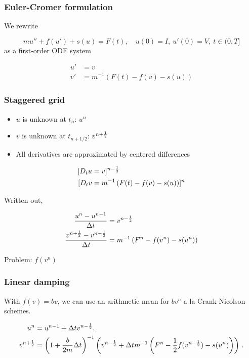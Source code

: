 \documentclass{beamer}
\begin{document}
\begin{frame}
\frametitle{Euler-Cromer formulation}

We rewrite

\[
mu'' + f(u') + s(u) = F(t),\quad u(0)=I,\ u'(0)=V,\ t\in (0,T]
\]
as a first-order ODE system

\begin{align*}
u' &= v
\\ 
v' &= m^{-1}\left(F(t) - f(v) - s(u)\right)
\end{align*}
\end{frame}

\begin{frame}
\frametitle{Staggered grid}

\begin{itemize}
 \item $u$ is unknown at $t_n$: $u^n$

 \item $v$ is unknown at $t_{n+1/2}$: $v^{n+\half}$

 \item All derivatives are approximated by centered differences
\end{itemize}

\noindent
\begin{align*}
\lbrack D_t u &= v\rbrack^{n-\half}
\\ 
\lbrack D_tv &= m^{-1}\left(F(t) - f(v) - s(u)\right)\rbrack^n
\end{align*}

Written out,

\begin{align*}
\frac{u^n - u^{n-1}}{\Delta t} &= v^{n-\half}\\ 
\frac{v^{n+\half} - v^{n-\half}}{\Delta t}
&= m^{-1}\left(F^n - f(v^n) - s(u^n)\right)
\end{align*}

Problem: $f(v^n)$
\end{frame}

\begin{frame}
\frametitle{Linear damping}

With $f(v)=bv$, we can use an arithmetic mean for $bv^n$ a la
Crank-Nicolson schemes.

\begin{align*}
u^n & = u^{n-1} + {\Delta t}v^{n-\half},\\ 
v^{n+\half} &= \left(1 + \frac{b}{2m}\Delta t\right)^{-1}\left(
v^{n-\half} + {\Delta t}
m^{-1}\left(F^n - {\half}f(v^{n-\half}) - s(u^n)\right)\right)\tp
\end{align*}
\end{frame}
\end{document}
